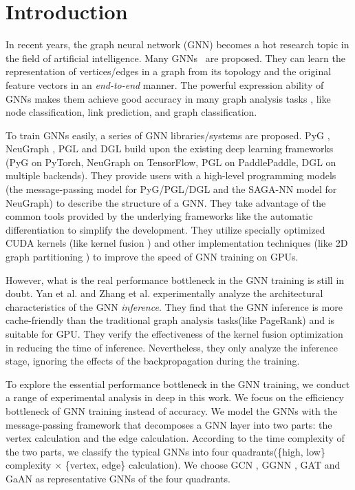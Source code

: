 \section{Introduction}
In recent years, the graph neural network (GNN) becomes a hot research topic in the field of artificial intelligence.
Many GNNs~\cite{kipf2017_gcn, defferrad2016_chebnet, li2018_agcn,li2015_ggnn, hamilton2017_graphsage, huang2018_gat, zhang2018_gaan} are proposed.
They can learn the representation of vertices/edges in a graph from its topology and the original feature vectors in an \emph{end-to-end} manner.
The powerful expression ability of GNNs makes them achieve good accuracy in many graph analysis tasks \cite{zhou2018_gnn_review, zhang2018_gnn_survey, comprehensive-survey-wu-2020}, like node classification, link prediction, and graph classification.

To train GNNs easily, a series of GNN libraries/systems \cite{PyG, DGL, ma2019_neugraph, zhu2019_aligraph, PGL} are proposed.
PyG \cite{PyG}, NeuGraph \cite{ma2019_neugraph}, PGL \cite{PGL} and DGL \cite{DGL} build upon the existing deep learning frameworks (PyG on PyTorch, NeuGraph on TensorFlow, PGL on PaddlePaddle, DGL on multiple backends).
They provide users with a high-level programming models (the message-passing model for PyG/PGL/DGL and the SAGA-NN model for NeuGraph) to describe the structure of a GNN.
They take advantage of the common tools provided by the underlying frameworks like the automatic differentiation to simplify the development.
They utilize specially optimized CUDA kernels (like kernel fusion \cite{DGL} \cite{ma2019_neugraph}) and other implementation techniques (like 2D graph partitioning \cite{ma2019_neugraph}) to improve the speed of GNN training on GPUs.

However, what is the real performance bottleneck in the GNN training is still in doubt.
Yan et al. \cite{yan2020_characterizing_gcn} and Zhang et al. \cite{zhang2020_analysis_neugraph} experimentally analyze the architectural characteristics of the GNN \emph{inference}.
They find that the GNN inference is more cache-friendly than the traditional graph analysis tasks(like PageRank) and is suitable for GPU.
They verify the effectiveness of the kernel fusion optimization in reducing the time of inference.
Nevertheless, they only analyze the inference stage, ignoring the effects of the backpropagation during the training.

To explore the essential performance bottleneck in the GNN training, we conduct a range of experimental analysis in deep in this work. 
We focus on the efficiency bottleneck of GNN training instead of accuracy. 
We model the GNNs with the message-passing framework that decomposes a GNN layer into two parts: the vertex calculation and the edge calculation.  
According to the time complexity of the two parts, we classify the typical GNNs into four quadrants(\{high, low\} complexity $\times$ \{vertex, edge\} calculation).
We choose GCN \cite{kipf2017_gcn}, GGNN \cite{li2015_ggnn}, GAT \cite{huang2018_gat} and GaAN \cite{zhang2018_gaan} as representative GNNs of the four quadrants.

